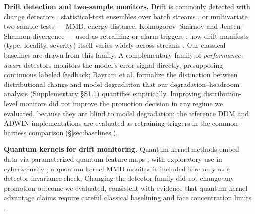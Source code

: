 \documentclass[journal]{IEEEtran}
\begin{document}
\textbf{Drift detection and two-sample monitors.} Drift is commonly detected with change detectors \cite{bifet2007learning,gama2004learning,baena2006early,raab2020reactive}, statistical-test ensembles over batch streams \cite{komorniczak2022ensemble}, or multivariate two-sample tests --- MMD, energy distance, Kolmogorov--Smirnov and Jensen--Shannon divergence --- used as retraining or alarm triggers \cite{gretton2012kernel,rizzo2016energy,lin1991divergence,darling1957ks}; how drift manifests (type, locality, severity) itself varies widely across streams \cite{aguiar2024locality}. Our classical baselines are drawn from this family. A complementary family of \emph{performance-aware} detectors monitors the model's error signal directly, presupposing continuous labeled feedback; Bayram et al. \cite{bayram2022degradation} formalize the distinction between distributional change and model degradation that our degradation--headroom analysis (Supplementary \S S1.1) quantifies empirically. Improving distribution-level monitors did not improve the promotion decision in any regime we evaluated, because they are blind to model degradation; the reference DDM and ADWIN implementations are evaluated as retraining triggers in the common-harness comparison (\S\ref{sec:baselines}).


\textbf{Quantum kernels for drift monitoring.} Quantum-kernel methods embed data via parameterized quantum feature maps \cite{havlicek2019supervised,schuld2019quantum,huang2021power}, with exploratory use in cybersecurity \cite{gouveia2020towards,nicesio2023quantum,bellante2025evaluating}; a quantum-kernel MMD monitor is included here only as a detector-invariance check. Changing the detector family did not change any promotion outcome we evaluated, consistent with evidence that quantum-kernel advantage claims require careful classical baselining and face concentration limits \cite{schnabel2025quantum,thanasilp2024concentration}.
\end{document}
